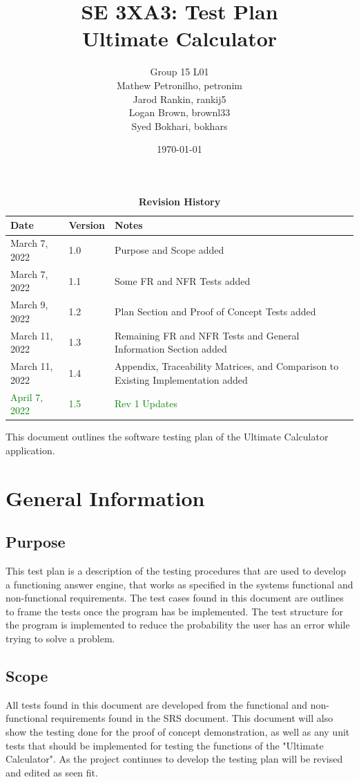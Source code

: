 \documentclass[12pt, titlepage]{article}
\title{SE 3XA3: Test Plan\\Ultimate Calculator}
\author{Group 15 L01
		\\ Mathew Petronilho, petronim
		\\ Jarod Rankin, rankij5
		\\ Logan Brown, brownl33
	    \\ Syed Bokhari, bokhars
}
\date{\today}
\begin{document}
\maketitle

\tableofcontents
\listoftables
\listoffigures

\begin{table}[bp]
\caption{\bf Revision History}
\begin{tabularx}{\textwidth}{p{3cm}p{2cm}X}
\toprule {\bf Date} & {\bf Version} & {\bf Notes}\\
\midrule
March 7, 2022 & 1.0 & Purpose and Scope added\\
March 7, 2022 & 1.1 & Some FR and NFR Tests added\\
March 9, 2022 & 1.2 & Plan Section and Proof of Concept Tests added\\
March 11, 2022 & 1.3 & Remaining FR and NFR Tests and General Information Section added\\
March 11, 2022 & 1.4 & Appendix, Traceability Matrices, and Comparison to Existing Implementation added\\
\textcolor{Green}{April 7, 2022} & \textcolor{Green}{1.5} & \textcolor{Green}{Rev 1 Updates}\\
\bottomrule
\end{tabularx}
\end{table}

\newpage


This document outlines the software testing plan of the Ultimate Calculator application.

\section{General Information}

\subsection{Purpose}
This test plan is a description of the testing procedures that are used to develop a functioning answer engine, that works as specified in the systems functional and non-functional requirements. The test cases found in this document are outlines to frame the tests once the program has be implemented. The test structure for the program is implemented to reduce the probability the user has an error while trying to solve a problem.
\subsection{Scope}
All tests found in this document are developed from the functional and non-functional requirements found in the SRS document. This document will also show the testing done for the proof of concept demonstration, as well as any unit tests that should be implemented for testing the functions of the "Ultimate Calculator". As the project continues to develop the testing plan will be revised and edited as seen fit.
\end{document}
